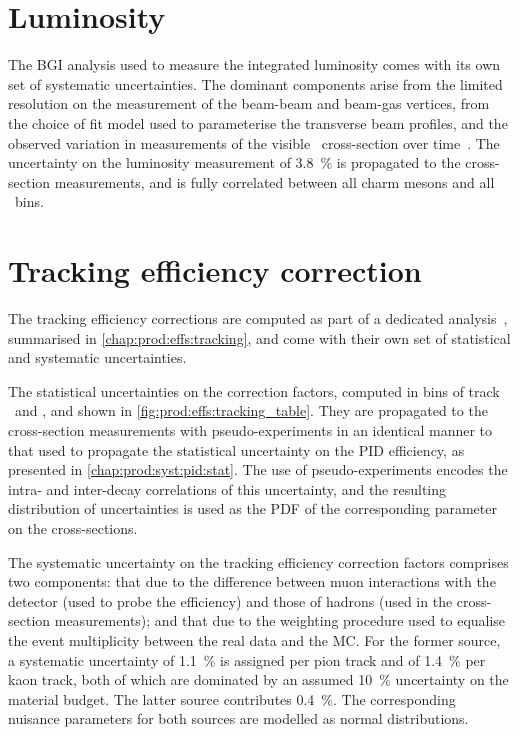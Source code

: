 \section{Luminosity}
\label{chap:prod:syst:lumi}

The \acl{BGI} analysis used to measure the integrated luminosity comes with its
own set of systematic uncertainties.
The dominant components arise from the limited resolution on the measurement of
the beam-beam and beam-gas vertices, from the choice of fit model used to
parameterise the transverse beam profiles, and the observed variation in
measurements of the visible \pp\ cross-section over
time~\cite{LHCb-PAPER-2014-047}.
The uncertainty on the luminosity measurement of \SI{3.8}{\%} is propagated to
the cross-section measurements, and is fully correlated between all charm
mesons and all \pTy\ bins.

\section{Tracking efficiency correction}
\label{chap:prod:syst:tracking}

The tracking efficiency corrections are computed as part of a dedicated
analysis~\cite{Aaij:2014pwa}, summarised in \cref{chap:prod:effs:tracking}, and
come with their own set of statistical and systematic uncertainties.

The statistical uncertainties on the correction factors, computed in bins of
track \ptot\ and \Eta, and shown in \cref{fig:prod:effs:tracking_table}.
They are propagated to the cross-section measurements with pseudo-experiments
in an identical manner to that used to propagate the statistical uncertainty on
the \ac{PID} efficiency, as presented in \cref{chap:prod:syst:pid:stat}.
The use of pseudo-experiments encodes the intra- and inter-decay correlations
of this uncertainty, and the resulting distribution of uncertainties is used as
the \ac{PDF} of the corresponding parameter on the cross-sections.

The systematic uncertainty on the tracking efficiency correction factors
comprises two components: that due to the difference between muon interactions
with the detector (used to probe the efficiency) and those of hadrons (used in
the cross-section measurements); and that due to the weighting procedure used
to equalise the event multiplicity between the real data and the \ac{MC}.
For the former source, a systematic uncertainty of \SI{1.1}{\percent} is
assigned per pion track and of \SI{1.4}{\percent} per kaon track, both of which
are dominated by an assumed \SI{10}{\percent} uncertainty on the material
budget.
The latter source contributes \SI{0.4}{\percent}.
The corresponding nuisance parameters for both sources are modelled as normal
distributions.

